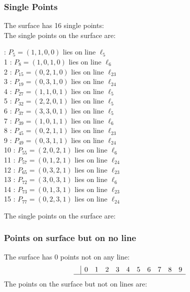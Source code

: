 \documentclass{article}
\begin{document}
{\subsubsection*{Single Points}
The surface has 16 single points:\\
The single points on the surface are:\\
\begin{multicols}{2}
 : $P_{5}=( 1, 1, 0, 0 )$ lies on line $\ell_{5}$\\
1 : $P_{8}=( 1, 0, 1, 0 )$ lies on line $\ell_{6}$\\
2 : $P_{15}=( 0, 2, 1, 0 )$ lies on line $\ell_{23}$\\
3 : $P_{19}=( 0, 3, 1, 0 )$ lies on line $\ell_{24}$\\
4 : $P_{27}=( 1, 1, 0, 1 )$ lies on line $\ell_{5}$\\
5 : $P_{32}=( 2, 2, 0, 1 )$ lies on line $\ell_{5}$\\
6 : $P_{37}=( 3, 3, 0, 1 )$ lies on line $\ell_{5}$\\
7 : $P_{39}=( 1, 0, 1, 1 )$ lies on line $\ell_{6}$\\
8 : $P_{45}=( 0, 2, 1, 1 )$ lies on line $\ell_{23}$\\
9 : $P_{49}=( 0, 3, 1, 1 )$ lies on line $\ell_{24}$\\
10 : $P_{55}=( 2, 0, 2, 1 )$ lies on line $\ell_{6}$\\
11 : $P_{57}=( 0, 1, 2, 1 )$ lies on line $\ell_{24}$\\
12 : $P_{65}=( 0, 3, 2, 1 )$ lies on line $\ell_{23}$\\
13 : $P_{72}=( 3, 0, 3, 1 )$ lies on line $\ell_{6}$\\
14 : $P_{73}=( 0, 1, 3, 1 )$ lies on line $\ell_{23}$\\
15 : $P_{77}=( 0, 2, 3, 1 )$ lies on line $\ell_{24}$\\
\end{multicols}
The single points on the surface are:\\
\subsubsection*{Points on surface but on no line}
The surface has 0 points not on any line:\\
$$
\begin{array}{r|*{10}{r}}
 & 0 & 1 & 2 & 3 & 4 & 5 & 6 & 7 & 8 & 9\\
\hline
\end{array}
$$
The points on the surface but not on lines are:\\
\begin{multicols}{2}
\noindent
\end{multicols}
}
\end{document}
